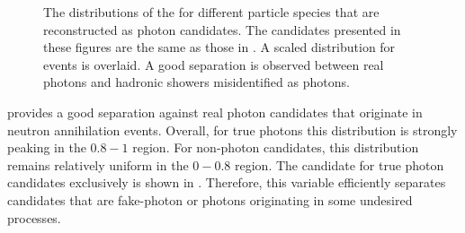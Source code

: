 \begin{figure}[htbp!]
    \centering
    \caption{\label{fig:zmva_distribution} The distributions of the \ZMVA for different particle species that are reconstructed as photon candidates.
    The candidates presented in these figures are the same as those in .
    A scaled \ZMVA distribution for \BtoXsgamma events is overlaid.
    A good separation is observed between real photons and hadronic showers misidentified as photons.}
\end{figure}

\ZMVA provides a good separation against real photon candidates that originate in neutron annihilation events.
Overall, for true \BtoXsgamma photons this distribution is strongly peaking in the $0.8-1$ region.
For non-\BtoXsgamma photon candidates, this distribution remains relatively uniform in the $0-0.8$ region.
The \ZMVA candidate for true photon candidates exclusively is shown in .
Therefore, this variable efficiently separates candidates that are fake-photon or photons originating in some undesired processes.


